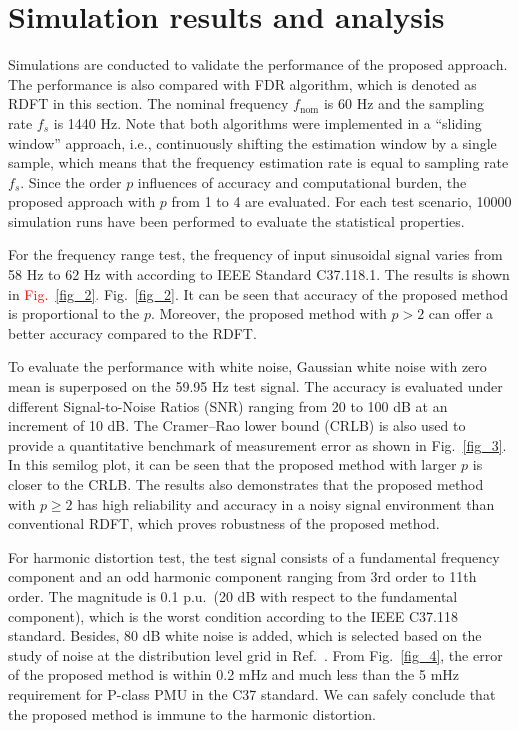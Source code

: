 \documentclass[journal,twoside]{IEEEtran}
\begin{document}
\section{Simulation results and analysis}
Simulations are conducted to validate the performance of the proposed approach. The performance is also compared with FDR algorithm\cite{chenjian,7265090}, which is denoted as RDFT in this section. The nominal frequency $f_\mathrm{nom}$ is 60 Hz and the sampling rate $f_s$ is 1440 Hz. Note that both algorithms were implemented in a “sliding window” approach, i.e., continuously shifting the estimation window by a single sample, which means that the frequency estimation rate is equal to sampling rate $f_s$. Since the order $p$ influences of accuracy and computational burden, the proposed approach with $p$ from 1 to 4 are evaluated. For each test scenario, 10000 simulation runs have been performed to evaluate the statistical properties.

For the frequency range test, the  frequency of  input sinusoidal signal  varies from 58 Hz to 62 Hz with according to IEEE Standard C37.118.1. The results is shown in \textcolor{red}{ Fig.~\ref{fig_2}.} Fig.~\ref{fig_2}. It can be seen that accuracy of the proposed method is proportional to the $p$. Moreover, the proposed method with  $p>2$ can offer a better accuracy compared to the RDFT.

To evaluate the performance with white noise, Gaussian white noise with zero mean is superposed on the 59.95 Hz test signal. The accuracy is evaluated under different Signal-to-Noise Ratios (SNR) ranging from 20 to 100 dB at an increment of 10 dB. The Cramer–Rao lower bound (CRLB) is also used to provide a quantitative benchmark of measurement error as shown in Fig.~\ref{fig_3}. In this semilog plot, it can be seen that the proposed method with larger $p$ is closer to the CRLB. The results also  demonstrates that the  proposed method with $p\geq2$ has high reliability and accuracy in a noisy signal environment than conventional RDFT, which proves robustness of the proposed method.

For harmonic distortion test, the test signal consists of a fundamental frequency component and an odd harmonic component ranging from 3rd order  to 11th order. The magnitude is 0.1 p.u.~(20 dB with respect to the fundamental component), which is the worst condition according to the IEEE  C37.118 standard\cite{c37}. Besides, 80 dB white noise is added, which is selected based on the study of noise at the distribution level grid in Ref.~\cite{7051271}. From Fig.~\ref{fig_4}, the error of the proposed method is within 0.2 mHz and much less than the 5 mHz requirement for P-class PMU in the C37 standard. We can safely conclude that the proposed method is immune to the harmonic distortion.
\end{document}
